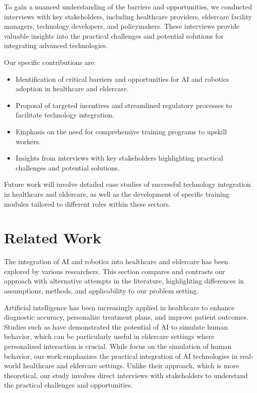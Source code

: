\documentclass{article} %
\begin{document}
To gain a nuanced understanding of the barriers and opportunities, we conducted interviews with key stakeholders, including healthcare providers, eldercare facility managers, technology developers, and policymakers. These interviews provide valuable insights into the practical challenges and potential solutions for integrating advanced technologies.

Our specific contributions are:
\begin{itemize}
    \item Identification of critical barriers and opportunities for AI and robotics adoption in healthcare and eldercare.
    \item Proposal of targeted incentives and streamlined regulatory processes to facilitate technology integration.
    \item Emphasis on the need for comprehensive training programs to upskill workers.
    \item Insights from interviews with key stakeholders highlighting practical challenges and potential solutions.
\end{itemize}

Future work will involve detailed case studies of successful technology integration in healthcare and eldercare, as well as the development of specific training modules tailored to different roles within these sectors.

\section{Related Work}
\label{sec:related}

The integration of AI and robotics into healthcare and eldercare has been explored by various researchers. This section compares and contrasts our approach with alternative attempts in the literature, highlighting differences in assumptions, methods, and applicability to our problem setting.

Artificial intelligence has been increasingly applied in healthcare to enhance diagnostic accuracy, personalize treatment plans, and improve patient outcomes. Studies such as \citet{park2023generative} have demonstrated the potential of AI to simulate human behavior, which can be particularly useful in eldercare settings where personalized interaction is crucial. While \citet{park2023generative} focus on the simulation of human behavior, our work emphasizes the practical integration of AI technologies in real-world healthcare and eldercare settings. Unlike their approach, which is more theoretical, our study involves direct interviews with stakeholders to understand the practical challenges and opportunities.
\end{document}
